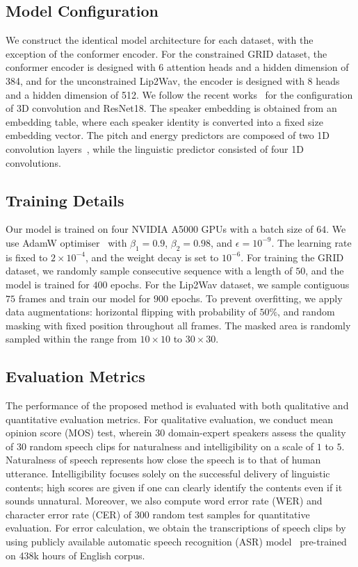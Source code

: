 \documentclass[letterpaper]{article} %
\begin{document}
\subsection{Model Configuration}
We construct the identical model architecture for each dataset, with the exception of the conformer encoder.
For the constrained GRID dataset, the conformer encoder is designed with 6 attention heads and a hidden dimension of 384, and for the unconstrained Lip2Wav, the encoder is designed with 8 heads and a hidden dimension of 512.
We follow the recent works~\cite{mira2022svts, kim2023lip} for the configuration of 3D convolution and ResNet18. The speaker embedding is obtained from an embedding table, where each speaker identity is converted into a fixed size embedding vector. The pitch and energy predictors are composed of two 1D convolution layers~\cite{lancucki2021fastpitch}, while the linguistic predictor consisted of four 1D convolutions.

\subsection{Training Details}

Our model is trained on four NVIDIA A5000 GPUs with a batch size of $64$. We use AdamW optimiser~\cite{loshchilov2017decoupled} with $\beta_1=0.9$, $\beta_2=0.98$, and $\epsilon=10^{-9}$. The learning rate is fixed to $2\times10^{-4}$, and the weight decay is set to $10^{-6}$. 
For training the GRID dataset, we randomly sample consecutive sequence with a length of $50$, and the model is trained for $400$ epochs. For the Lip2Wav dataset, we sample contiguous $75$ frames and train our model for $900$ epochs.
To prevent overfitting, we apply data augmentations: horizontal flipping with probability of $50\%$, and random masking with fixed position throughout all frames. The masked area is randomly sampled within the range from $10\times10$ to $30\times30$.

\subsection{Evaluation Metrics}

The performance of the proposed method is evaluated with both qualitative and quantitative evaluation metrics. 
For qualitative evaluation, we conduct mean opinion score (MOS) test, wherein $30$ domain-expert speakers assess the quality of $30$ random speech clips for naturalness and intelligibility on a scale of $1$ to $5$.
Naturalness of speech represents how close the speech is to that of human utterance. 
Intelligibility focuses solely on the successful delivery of linguistic contents; high scores are given if one can clearly identify the contents even if it sounds unnatural. 
Moreover, we also compute word error rate (WER) and character error rate (CER) of $300$ random test samples for quantitative evaluation.
For error calculation, we obtain the transcriptions of speech clips by using publicly available automatic speech recognition (ASR) model~\cite{radford2023robust} pre-trained on 438k hours of English corpus.
\end{document}
